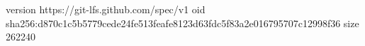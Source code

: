 version https://git-lfs.github.com/spec/v1
oid sha256:d870c1c5b5779cede24fe513feafe8123d63fdc5f83a2e016795707c12998f36
size 262240
